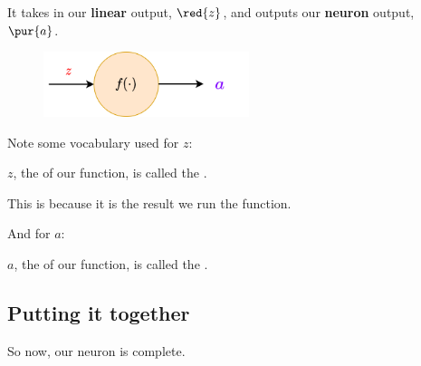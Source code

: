         It takes in our \textbf{linear} output, $\red{z}$, and outputs our \textbf{neuron} output, $\pur{a}$.
        
        \begin{figure}[H]
            \centering
            \qquad\quad\;
            \includegraphics[width=60mm,scale=0.4]{images/nn_images/nonlinear_unit.png}
        \end{figure}
        
        Note some vocabulary used for $z$:\\
        
        \begin{notation}
            $z$, the  of our  function, is called the .
            
            This is because it is the result  we run the  function.
        \end{notation}
        
        And for $a$:\\

        \begin{notation}
            $a$, the  of our  function, is called the .
        \end{notation}
        
    \subsection{Putting it together}
    
        So now, our neuron is complete.\\

